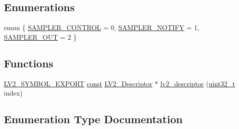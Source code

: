 \subsection*{Enumerations}
\begin{DoxyCompactItemize}
\item 
enum \{ \hyperlink{lv2_2lv2_2plugins_2eg-sampler_8lv2_2sampler_8c_ac791b66a82093c303b1b2aaf4f185edea440ce31231d76465f4fdd3024a4baf16}{S\+A\+M\+P\+L\+E\+R\+\_\+\+C\+O\+N\+T\+R\+OL} = 0, 
\hyperlink{lv2_2lv2_2plugins_2eg-sampler_8lv2_2sampler_8c_ac791b66a82093c303b1b2aaf4f185edea803a69ce97df5fcd9fc0a15141fa2d42}{S\+A\+M\+P\+L\+E\+R\+\_\+\+N\+O\+T\+I\+FY} = 1, 
\hyperlink{lv2_2lv2_2plugins_2eg-sampler_8lv2_2sampler_8c_ac791b66a82093c303b1b2aaf4f185edea57595cc1260192c0991dedbd49b19546}{S\+A\+M\+P\+L\+E\+R\+\_\+\+O\+UT} = 2
 \}
\end{DoxyCompactItemize}
\subsection*{Functions}
\begin{DoxyCompactItemize}
\item 
\hyperlink{lv2_8h_a05eb2f14429fd6ae501265b5e5af8309}{L\+V2\+\_\+\+S\+Y\+M\+B\+O\+L\+\_\+\+E\+X\+P\+O\+RT} \hyperlink{getopt1_8c_a2c212835823e3c54a8ab6d95c652660e}{const} \hyperlink{lv2_8h_ac9db79f137f126ef10ef707b6de85a78}{L\+V2\+\_\+\+Descriptor} $\ast$ \hyperlink{lv2_2lv2_2plugins_2eg-sampler_8lv2_2sampler_8c_affedc7aabe2715522365f21a9c1ff65d}{lv2\+\_\+descriptor} (\hyperlink{lib-src_2ffmpeg_2win32_2stdint_8h_a6eb1e68cc391dd753bc8ce896dbb8315}{uint32\+\_\+t} index)
\end{DoxyCompactItemize}


\subsection{Enumeration Type Documentation}
